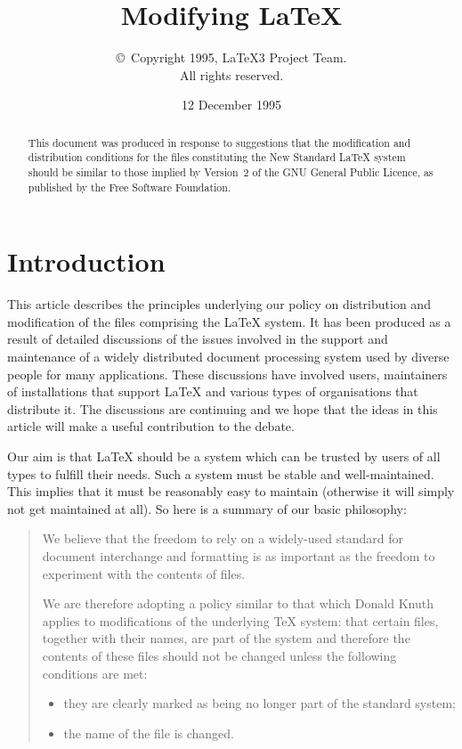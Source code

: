 \documentclass{ltxguide}[1995/11/28]
\title{Modifying \LaTeX}
\author{\copyright~Copyright 1995, \LaTeX3 Project Team.\\
   All rights reserved.}
\date{12 December 1995}
\begin{document}
\maketitle

\tableofcontents

\begin{abstract}
  This document was produced in response to suggestions that the
  modification and distribution conditions for the files constituting
  the New Standard \LaTeX{} system should be similar to those implied
  by Version~2 of the \textsc{GNU} General Public Licence, as
  published by the Free Software Foundation.
\end{abstract}

\section{Introduction}
\label{sec:intro}

This article describes the principles underlying our policy on
distribution and modification of the files comprising the \LaTeX{}
system.  It has been produced as a result of detailed discussions of
the issues involved in the support and maintenance of a widely
distributed document processing system used by diverse people for many
applications.  These discussions have involved users, maintainers of
installations that support \LaTeX{} and various types of organisations
that distribute it.  The discussions are continuing and we hope that
the ideas in this article will make a useful contribution to the
debate.

Our aim is that \LaTeX{} should be a system which can be trusted by
users of all types to fulfill their needs.  Such a system must be
stable and well-maintained.  This implies that it must be reasonably
easy to maintain (otherwise it will simply not get maintained at
all).  So here is a summary of our basic philosophy:
\begin{quote}
  We believe that the freedom to rely on a widely-used standard for
  document interchange and formatting is as important as the freedom to
  experiment with the contents of files.

  We are therefore adopting a policy similar to that which Donald
  Knuth applies to modifications of the underlying \TeX{} system: that
  certain files, together with their names, are part of the system and
  therefore the contents of these files should not be changed unless
  the following conditions are met:
  \begin{itemize}
  \item they are clearly marked as being no longer part of the
    standard system;
  \item the name of the file is changed.
  \end{itemize}
\end{quote}
\end{document}
